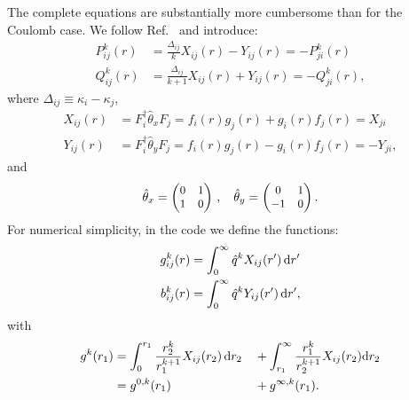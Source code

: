 \documentclass[10pt,twocolumn,a4paper]{article}%
\newcommand{\matr}[4]{\ensuremath{\begin{pmatrix}#1&#2\\#3&#4\end{pmatrix}}}	%
\newcommand{\be}{\begin{equation}}
\newcommand{\ee}{\end{equation}}
\def\d{\ensuremath{{\rm d}}}
\newcommand{\s}{\ensuremath{\sigma}}
\begin{document}
The complete equations are substantially more cumbersome than for the Coulomb case.
We follow Ref.~\cite{Mann1971} and introduce:
\begin{equation}
\begin{split}
P^k_{ij}(r) &= \frac{\Delta_{ij}}{k}X_{ij}(r)-Y_{ij}(r) = -P^k_{ji}(r)\\
Q^k_{ij}(r) &= \frac{\Delta_{ij}}{k+1}X_{ij}(r)+Y_{ij}(r) = -Q^k_{ji}(r),
\end{split}
\end{equation}
where $\Delta_{ij}\equiv\kappa_i-\kappa_j$, 
\begin{equation}
\begin{split}
X_{ij}(r) &= F_i^\dag\hat\theta_xF_j = f_i(r)g_j(r) + g_i(r)f_j(r) = X_{ji}\\
Y_{ij}(r) &= F_i^\dag\hat\theta_yF_j = f_i(r)g_j(r) - g_i(r)f_j(r) = -Y_{ji},
\end{split}
\end{equation}
and 
\be\small
\hat\theta_x =  \matr{0}{1}{1}{0} \, , \quad
\hat\theta_y =  \matr{0}{1}{-1}{0}.
\ee
For numerical simplicity, in the code we define the functions:
\begin{align}
    g^k_{ij}(r) &= 
    \int_0^\infty  \hat q^k X_{ij}(r') \,\d r'\\
    b^k_{ij}(r) &= 
    \int_0^\infty  \hat q^k Y_{ij}(r') \,\d r',
\end{align}
with
\begin{align}
    g^k(r_1) 
    &= \int_0^{r_1}  \frac{r_2^k}{r_1^{k+1}} X_{ij}(r_2) \,\d r_2
    &&+\int_{r_1}^\infty  \frac{r_1^k}{r_2^{k+1}} X_{ij}(r_2) \d r_2\notag\\
    &= g^{0,k}(r_1) &&+ g^{\infty,k}(r_1).
\end{align}
\end{document}
